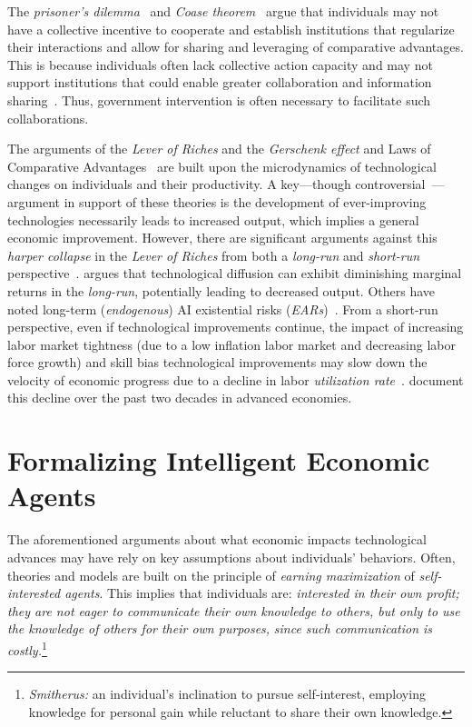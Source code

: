 \documentclass{article} %
\begin{document}
The \emph{prisoner's dilemma}~\citep{poundstone2011prisoner} and \emph{Coase theorem}~\citep{coase2013problem} argue that individuals may not have a collective incentive to cooperate and establish institutions that regularize their interactions and allow for sharing and leveraging of comparative advantages.
This is because individuals often lack collective action capacity and may not support institutions that could enable greater collaboration and information sharing~\citep{buchanan1965calculus, olson2012logic, ostrom1990governing}.
Thus, government intervention is often necessary to facilitate such collaborations.

The arguments of the \emph{Lever of Riches} and the \emph{Gerschenk effect} and Laws of Comparative Advantages~\citep{smith2002inquiry} are built upon the microdynamics of technological changes on individuals and their productivity.
A key---though controversial~\citep{landymore2023sam, finance2024ai}---{argument} in support of these theories is  the development of ever-improving technologies necessarily leads to increased output, which implies a general economic improvement.
However, there are significant arguments against this \emph{harper collapse} in the \emph{Lever of Riches} from both a \emph{long-run} and \emph{short-run} perspective~\citep{acemoglu2023power, swoboda2025examining}.
\citet{acemoglu2023power} argues that technological diffusion can exhibit diminishing marginal returns in the \emph{long-run}, potentially leading to decreased output.
Others have noted long-term (\emph{endogenous}) AI existential risks (\emph{EARs})~\citep{bender2021dangers, boiko2023emergent, lu2024ai, Kulveit2025GradualDS, hendrycks2023overview}.
From a short-run perspective, even if technological improvements continue, the impact of increasing labor market tightness (due to a low inflation labor market and decreasing labor force growth) and skill bias technological improvements may slow down the velocity of economic progress due to a decline in labor \emph{utilization rate}~\citep{acemoglu2012why}.
\citet{acemoglu2012why} document this decline over the past two decades in advanced economies.


\section{Formalizing Intelligent Economic Agents}

\label{RfC}

The aforementioned arguments about what economic impacts technological advances may have rely on key assumptions about individuals' behaviors.
Often, theories and models are built on the principle of \emph{earning maximization} of \emph{self-interested agents}.
This implies that individuals are:    \emph{interested in their own profit; they are not eager to communicate their own knowledge to others, but only to use the knowledge of others for their own purposes,} \emph{since such communication is costly.}\footnote{\citet{smith2002inquiry}\emph{Smitherus:} an individual's inclination to pursue self-interest, employing knowledge for personal gain while reluctant to share their own knowledge.}
\end{document}
